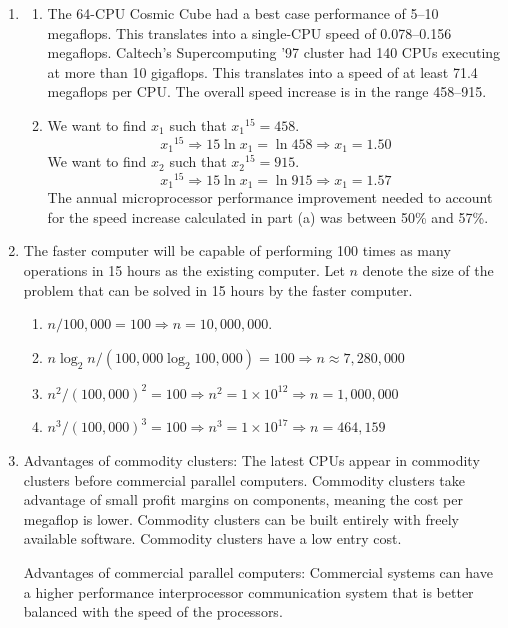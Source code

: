 \begin{enumerate}
\item \begin{enumerate}
      \item
      The 64-CPU Cosmic Cube had a best case performance of 5--10 megaflops.
      This translates into a single-CPU speed of 0.078--0.156 megaflops.
      Caltech's Supercomputing '97 cluster had 140 CPUs executing at more
      than 10 gigaflops. This translates into a speed of at least
      71.4 megaflops per CPU.
      The overall speed increase is in the range 458--915.

      \item
      We want to find $x_1$ such that ${x_1}^{15} = 458$.
      $${x_1}^{15} \Rightarrow 15\ln x_1 = \ln 458 \Rightarrow x_1 = 1.50$$
      We want to find $x_2$ such that ${x_2}^{15} = 915$.
      $${x_1}^{15} \Rightarrow 15\ln x_1 = \ln 915 \Rightarrow x_1 = 1.57$$
      The annual microprocessor performance improvement needed to account for
      the speed increase calculated in part (a) was between 50\% and 57\%.
      \end{enumerate}

\item The faster computer will be capable of performing 100 times as many
      operations in 15 hours as the existing computer.
      Let $n$ denote the size of the problem that can be solved in 15 hours
      by the faster computer.
      \begin{enumerate}
      \item $n/100,000 = 100 \Rightarrow n = 10,000,000$.
      \item $n\log_2 n/(100,000 \log_2 100,000) = 100 \Rightarrow
             n \approx 7,280,000$
      \item $n^2/(100,000)^2 = 100 \Rightarrow n^2 = 1 \times 10^{12}
            \Rightarrow n = 1,000,000$
      \item $n^3/(100,000)^3 = 100 \Rightarrow n^3 = 1 \times 10^{17}
            \Rightarrow n = 464,159$
      \end{enumerate}

\item Advantages of commodity clusters:
      The latest CPUs appear in commodity clusters before commercial
      parallel computers.
      Commodity clusters take advantage of small profit margins on components,
      meaning the cost per megaflop is lower.
      Commodity clusters can be built entirely with freely available software.
      Commodity clusters have a low entry cost.

      Advantages of commercial parallel computers:
      Commercial systems can have a higher performance
      interprocessor communication system that is better balanced
      with the speed of the processors.


\end{enumerate}
